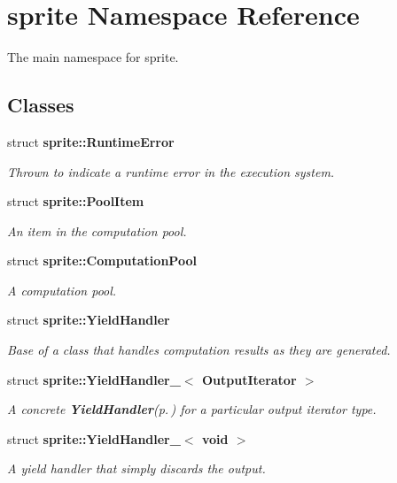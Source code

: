 \section{sprite Namespace Reference}
\label{namespacesprite}
The main namespace for sprite.  


\subsection*{Classes}
\begin{CompactItemize}
\item 
struct {\bf sprite::Runtime\-Error}
\begin{CompactList}\small\item\em Thrown to indicate a runtime error in the execution system. \item\end{CompactList}\item 
struct {\bf sprite::Pool\-Item}
\begin{CompactList}\small\item\em An item in the computation pool. \item\end{CompactList}\item 
struct {\bf sprite::Computation\-Pool}
\begin{CompactList}\small\item\em A computation pool. \item\end{CompactList}\item 
struct {\bf sprite::Yield\-Handler}
\begin{CompactList}\small\item\em Base of a class that handles computation results as they are generated. \item\end{CompactList}\item 
struct {\bf sprite::Yield\-Handler\_\-$<$ Output\-Iterator $>$}
\begin{CompactList}\small\item\em A concrete {\bf Yield\-Handler}{\rm (p.\,\pageref{structsprite_1_1YieldHandler})} for a particular output iterator type. \item\end{CompactList}\item 
struct {\bf sprite::Yield\-Handler\_\-$<$ void $>$}
\begin{CompactList}\small\item\em A yield handler that simply discards the output. \item\end{CompactList}\item 

\end{CompactItemize}

